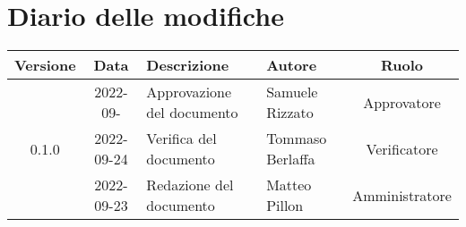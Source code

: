 \section*{Diario delle modifiche}
	\begin{center}
	\renewcommand{\arraystretch}{1.8} %
	\begin{tabular}{ |c|c|m{12em}|m{7em}|c| }
	\hline
	\textbf{Versione} & \textbf{Data} & \textbf{Descrizione} &  \textbf{Autore} &  \textbf{Ruolo} \\ %
	\hline
    & 2022-09- & Approvazione del documento & Samuele \newline Rizzato & Approvatore\\ 
	\hline
   0.1.0 & 2022-09-24 & Verifica del documento & Tommaso \newline Berlaffa  & Verificatore\\ 
	\hline
    & 2022-09-23 & Redazione del documento & Matteo \newline Pillon & Amministratore\\ 
	\hline
	\end{tabular}
	\end{center}
	\newpage